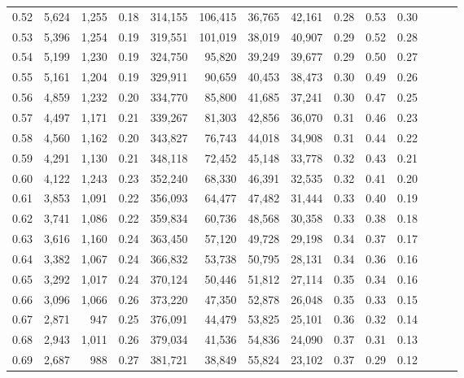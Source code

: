 \begin{tabular}{rrrrrrrrrrrrrr}
0.52 &   5,624 &  1,255 &  0.18 &  314,155 &  106,415 &  36,765 &  42,161 &  0.28 &  0.53 &      0.30 \\
0.53 &   5,396 &  1,254 &  0.19 &  319,551 &  101,019 &  38,019 &  40,907 &  0.29 &  0.52 &      0.28 \\
0.54 &   5,199 &  1,230 &  0.19 &  324,750 &   95,820 &  39,249 &  39,677 &  0.29 &  0.50 &      0.27 \\
0.55 &   5,161 &  1,204 &  0.19 &  329,911 &   90,659 &  40,453 &  38,473 &  0.30 &  0.49 &      0.26 \\
0.56 &   4,859 &  1,232 &  0.20 &  334,770 &   85,800 &  41,685 &  37,241 &  0.30 &  0.47 &      0.25 \\
0.57 &   4,497 &  1,171 &  0.21 &  339,267 &   81,303 &  42,856 &  36,070 &  0.31 &  0.46 &      0.23 \\
0.58 &   4,560 &  1,162 &  0.20 &  343,827 &   76,743 &  44,018 &  34,908 &  0.31 &  0.44 &      0.22 \\
0.59 &   4,291 &  1,130 &  0.21 &  348,118 &   72,452 &  45,148 &  33,778 &  0.32 &  0.43 &      0.21 \\
0.60 &   4,122 &  1,243 &  0.23 &  352,240 &   68,330 &  46,391 &  32,535 &  0.32 &  0.41 &      0.20 \\
0.61 &   3,853 &  1,091 &  0.22 &  356,093 &   64,477 &  47,482 &  31,444 &  0.33 &  0.40 &      0.19 \\
0.62 &   3,741 &  1,086 &  0.22 &  359,834 &   60,736 &  48,568 &  30,358 &  0.33 &  0.38 &      0.18 \\
0.63 &   3,616 &  1,160 &  0.24 &  363,450 &   57,120 &  49,728 &  29,198 &  0.34 &  0.37 &      0.17 \\
0.64 &   3,382 &  1,067 &  0.24 &  366,832 &   53,738 &  50,795 &  28,131 &  0.34 &  0.36 &      0.16 \\
0.65 &   3,292 &  1,017 &  0.24 &  370,124 &   50,446 &  51,812 &  27,114 &  0.35 &  0.34 &      0.16 \\
0.66 &   3,096 &  1,066 &  0.26 &  373,220 &   47,350 &  52,878 &  26,048 &  0.35 &  0.33 &      0.15 \\
0.67 &   2,871 &    947 &  0.25 &  376,091 &   44,479 &  53,825 &  25,101 &  0.36 &  0.32 &      0.14 \\
0.68 &   2,943 &  1,011 &  0.26 &  379,034 &   41,536 &  54,836 &  24,090 &  0.37 &  0.31 &      0.13 \\
0.69 &   2,687 &    988 &  0.27 &  381,721 &   38,849 &  55,824 &  23,102 &  0.37 &  0.29 &      0.12 \\

\end{tabular}
